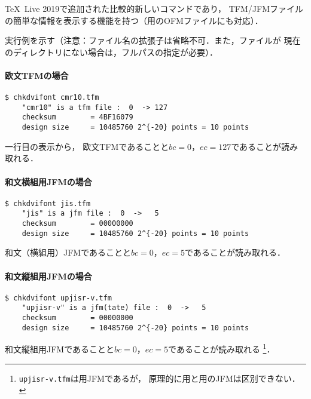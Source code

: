 \documentclass[a4paper,11pt,nomag]{jsarticle}
\def\size#1{\mathit{#1}}
\def\code#1{\texttt{#1}}
\begin{document}
\TeX\ Live 2019で追加された比較的新しいコマンドであり，
TFM/JFMファイルの簡単な情報を表示する機能を持つ（\OMEGA 用のOFMファイルにも対応）．

実行例を示す（注意：ファイル名の拡張子は省略不可．また，ファイルが
現在のディレクトリにない場合は，フルパスの指定が必要）．

\paragraph{欧文TFMの場合}
\begin{verbatim}
$ chkdvifont cmr10.tfm
    "cmr10" is a tfm file :  0  -> 127
    checksum        = 4BF16079
    design size     = 10485760 2^{-20} points = 10 points
\end{verbatim}
一行目の表示から，
欧文TFMであることと$\size{bc}=0$，$\size{ec}=127$であることが読み取れる．

\paragraph{和文横組用JFMの場合}
\begin{verbatim}
$ chkdvifont jis.tfm
    "jis" is a jfm file :  0  ->   5
    checksum        = 00000000
    design size     = 10485760 2^{-20} points = 10 points
\end{verbatim}
和文（横組用）JFMであることと$\size{bc}=0$，$\size{ec}=5$であることが読み取れる．

\paragraph{和文縦組用JFMの場合}
\begin{verbatim}
$ chkdvifont upjisr-v.tfm
    "upjisr-v" is a jfm(tate) file :  0  ->   5
    checksum        = 00000000
    design size     = 10485760 2^{-20} points = 10 points
\end{verbatim}
和文縦組用JFMであることと$\size{bc}=0$，$\size{ec}=5$であることが読み取れる
\footnote{\code{upjisr-v.tfm}は\upTeX 用JFMであるが，
原理的に\pTeX 用と\upTeX 用のJFMは区別できない．}．
\end{document}
